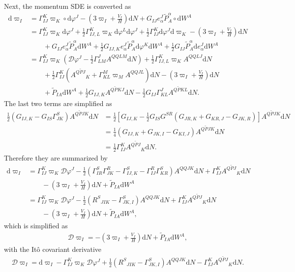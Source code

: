 \documentclass[aps, prd
, preprint
, nofootinbib 
, longbibliography
]{revtex4-1}
\newcommand{\dd}{\mathrm{d}}
\newcommand{\calD}{\mathcal{D}}
\newcommand{\bae}[1]{\begin{align} #1 \end{align}}
\begin{document}
Next, the momentum SDE is converted as
\bae{
    \dd\varpi_I&=\Gamma^K_{IJ}\varpi_K\circ\dd\varphi^J-\left(3\varpi_I+\frac{V_I}{H}\right)\dd N+G_{IJ}e^J_\alpha\tilde{P}^\alpha_A\circ\dd W^A \nonumber \\
    &=\Gamma^K_{IJ}\varpi_K\dd\varphi^J+\frac{1}{2}\Gamma^K_{IJ,L}\varpi_K\dd\varphi^L\dd\varphi^J+\frac{1}{2}\Gamma^K_{IJ}\dd\varphi^J\dd\varpi_K-\left(3\varpi_I+\frac{V_I}{H}\right)\dd N \nonumber \\
    &\qquad+G_{IJ}e^J_\alpha\tilde{P}^\alpha_A\dd W^A+\frac{1}{2}G_{IJ,K}e^J_\alpha\tilde{P}^\alpha_A\dd\varphi^K\dd W^A+\frac{1}{2}G_{IJ}\tilde{P}^\alpha_A\dd e^J_\alpha\dd W^A \nonumber \\
    &=\Gamma^K_{IJ}\varpi_K\left(\calD\varphi^J-\frac{1}{2}\Gamma^J_{LM}A^{QQLM}\dd N\right)+\frac{1}{2}\Gamma^K_{IJ,L}\varpi_KA^{QQLJ}\dd N \nonumber \\
    &\qquad +\frac{1}{2}\Gamma^K_{IJ}\left(A^{Q\tilde{P}J}{}_K+\Gamma_{KL}^M\varpi_MA^{QQJL}\right)\dd N-\left(3\varpi_I+\frac{V_I}{H}\right)\dd N \nonumber \\
    &\qquad +\tilde{P}_{IA}\dd W^A+\frac{1}{2}G_{IJ,K}A^{Q\tilde{P}KJ}\dd N-\frac{1}{2}G_{IJ}\Gamma^J_{KL}A^{Q\tilde{P}KL}\dd N.
}
The last two terms are simplified as
\bae{
    \frac{1}{2}\left(G_{IJ,K}-G_{IS}\Gamma^S_{JK}\right)A^{Q\tilde{P}JK}\dd N&=\frac{1}{2}\left[G_{IJ,K}-\frac{1}{2}G_{IS}G^{SR}\left(G_{JR,K}+G_{KR,J}-G_{JK,R}\right)\right]A^{Q\tilde{P}JK}\dd N \nonumber \\
    &=\frac{1}{4}\left(G_{IJ,K}+G_{JK,I}-G_{KI,J}\right)A^{Q\tilde{P}JK}\dd N \nonumber \\
    &=\frac{1}{2}\Gamma_{IJ}^KA^{Q\tilde{P}J}{}_K\dd N.
}
Therefore they are summarized by
\bae{
    \dd\varpi_I&=\Gamma^K_{IJ}\varpi_K\calD\varphi^J-\frac{1}{2}(\Gamma^S_{IR}\Gamma^R_{JK}-\Gamma^S_{IJ,K}-\Gamma^R_{IJ}\Gamma^S_{KR})A^{QQJK}\dd N+\Gamma^K_{IJ}A^{Q\tilde{P}J}{}_K\dd N \nonumber \\
    &\qquad-\left(3\varpi_I+\frac{V_I}{H}\right)\dd N+\tilde{P}_{IA}\dd W^A \nonumber \\
    &=\Gamma^K_{IJ}\varpi_K\calD\varphi^J-\frac{1}{2}(R^S{}_{JIK}-\Gamma^S_{JK,I})A^{QQJK}\dd N+\Gamma_{IJ}^KA^{Q\tilde{P}J}{}_K\dd N \nonumber \\
    &\qquad -\left(3\varpi_I+\frac{V_I}{H}\right)\dd N+\tilde{P}_{IA}\dd W^A,
}
which is simplified as
\bae{
    \calD\varpi_I=-\left(3\varpi_I+\frac{V_I}{H}\right)\dd N+\tilde{P}_{IA}\dd W^A,
}
with the It\^o covariant derivative
\bae{
    \calD\varpi_I=\dd\varpi_I-\Gamma^K_{IJ}\varpi_K\calD\varphi^J+\frac{1}{2}(R^S{}_{JIK}-\Gamma^S_{JK,I})A^{QQJK}\dd N-\Gamma^K_{IJ}A^{Q\tilde{P}J}{}_K\dd N.
}
\end{document}
